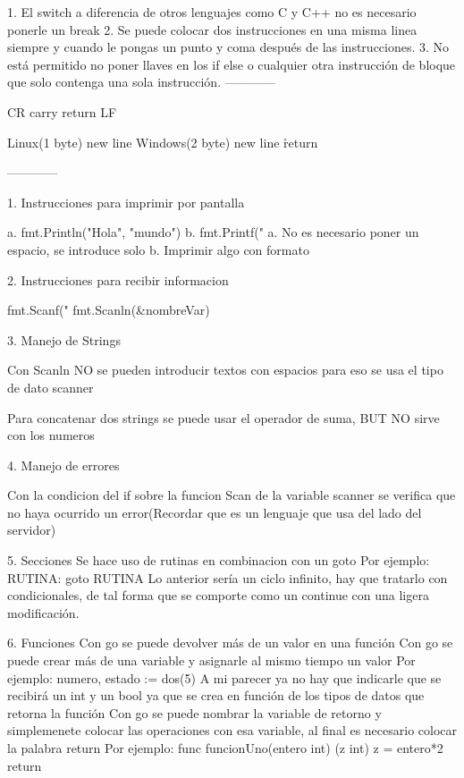 1. El switch a diferencia de otros lenguajes como C y C++ no es necesario ponerle un break
2. Se puede colocar dos instrucciones en una misma linea siempre y cuando le pongas un punto 
y coma después de las instrucciones.
3. No está permitido no poner llaves en los if else o cualquier otra instrucción de bloque 
que solo contenga una sola instrucción.
------------

CR carry return
LF 

Linux(1 byte) \n new line 
Windows(2 byte) \n new line \r return 

------------

1. Instrucciones para imprimir por pantalla

a. fmt.Println("Hola", "mundo")
b. fmt.Printf("%
a. No es necesario poner un espacio, se introduce solo
b. Imprimir algo con formato

2. Instrucciones para recibir informacion

fmt.Scanf("%
fmt.Scanln(&nombreVar)



3. Manejo de Strings

    Con Scanln NO se pueden introducir textos con espacios
para eso se usa el tipo de dato scanner

    Para concatenar dos strings se puede usar el operador
de suma, BUT NO sirve con los numeros


4. Manejo de errores

    Con la condicion del if sobre la funcion Scan de la variable
scanner se verifica que no haya ocurrido un error(Recordar 
que es un lenguaje que usa del lado del servidor)

5. Secciones
Se hace uso de rutinas en combinacion con un goto
Por ejemplo:
    RUTINA:
        goto RUTINA 
Lo anterior sería un ciclo infinito, hay que tratarlo con condicionales, de tal
forma que se comporte como un continue con una ligera modificación.

6. Funciones
Con go se puede devolver más de un valor en una función
Con go se puede crear más de una variable y asignarle al mismo tiempo un valor
Por ejemplo:
    numero, estado := dos(5)
A mi parecer ya no hay que indicarle que se recibirá un int y un bool ya que 
se crea en función de los tipos de datos que retorna la función
Con go se puede nombrar la variable de retorno y simplemenete colocar las
operaciones con esa variable, al final es necesario colocar la palabra return
Por ejemplo:
    func funcionUno(entero int) (z int){
        z = entero*2
        return
    }

